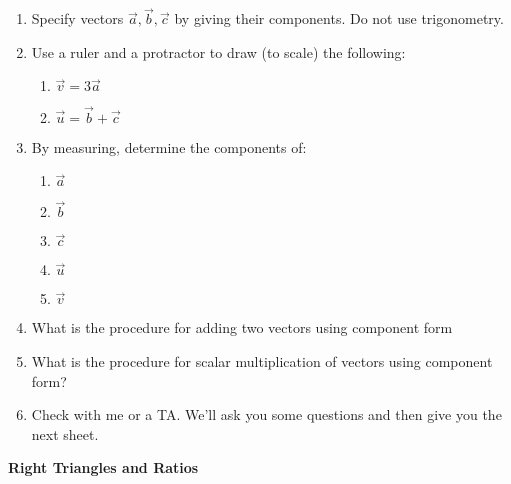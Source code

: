 \documentclass[12pt]{article}
\begin{document}
\begin{enumerate}
\item Specify vectors $\vec a, \vec b, \vec c$ by giving their
components.  Do not use trigonometry.

\item Use a ruler and a protractor to draw (to scale) the following:
\begin{enumerate}
\setlength{\itemsep}{0mm}
  \item $ \vec{v} = 3\vec{a}$
  \item $ \vec{u} = \vec{b} + \vec{c}$
\end{enumerate}

\item By measuring, determine the components of:
\begin{enumerate}
\setlength{\itemsep}{0mm}
  \item $\vec{a}$
  \item $\vec{b}$
  \item $\vec{c}$
  \item $\vec{u}$
  \item $\vec{v}$
\end{enumerate}

\item What is the procedure for adding two vectors using component
  form

\item What is the procedure for scalar multiplication of vectors using
  component form? 

\item Check with me or a TA.  We'll ask you some questions and then
  give you the next sheet.  

\end{enumerate}






\newpage 


\begin{center}
  {\bf Right Triangles and Ratios}\\
\end{center}

\hspace{2mm}\\
\end{document}
